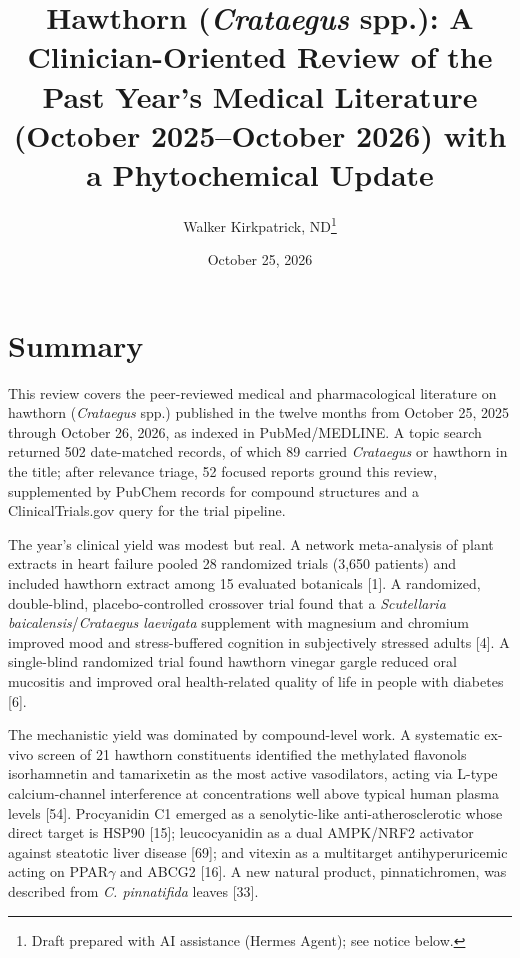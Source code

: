 \documentclass[11pt]{article}
\title{Hawthorn (\emph{Crataegus} spp.): A Clinician-Oriented Review of the Past Year's Medical Literature (October 2025--October 2026) with a Phytochemical Update}
\author{Walker Kirkpatrick, ND\thanks{Draft prepared with AI assistance (Hermes Agent); see notice below.}}
\date{October 25, 2026}
\begin{document}
\maketitle
\begin{center}\end{center}

\section*{Summary}
This review covers the peer-reviewed medical and pharmacological literature on hawthorn (\emph{Crataegus} spp.) published in the twelve months from October 25, 2025 through October 26, 2026, as indexed in PubMed/MEDLINE. A topic search returned 502 date-matched records, of which 89 carried \emph{Crataegus} or hawthorn in the title; after relevance triage, 52 focused reports ground this review, supplemented by PubChem records for compound structures and a ClinicalTrials.gov query for the trial pipeline.

The year's clinical yield was modest but real. A network meta-analysis of plant extracts in heart failure pooled 28 randomized trials (3,650 patients) and included hawthorn extract among 15 evaluated botanicals [1]. A randomized, double-blind, placebo-controlled crossover trial found that a \emph{Scutellaria baicalensis}/\emph{Crataegus laevigata} supplement with magnesium and chromium improved mood and stress-buffered cognition in subjectively stressed adults [4]. A single-blind randomized trial found hawthorn vinegar gargle reduced oral mucositis and improved oral health-related quality of life in people with diabetes [6].

The mechanistic yield was dominated by compound-level work. A systematic ex-vivo screen of 21 hawthorn constituents identified the methylated flavonols isorhamnetin and tamarixetin as the most active vasodilators, acting via L-type calcium-channel interference at concentrations well above typical human plasma levels [54]. Procyanidin C1 emerged as a senolytic-like anti-atherosclerotic whose direct target is HSP90 [15]; leucocyanidin as a dual AMPK/NRF2 activator against steatotic liver disease [69]; and vitexin as a multitarget antihyperuricemic acting on PPAR$\gamma$ and ABCG2 [16]. A new natural product, pinnatichromen, was described from \emph{C. pinnatifida} leaves [33].
\end{document}
